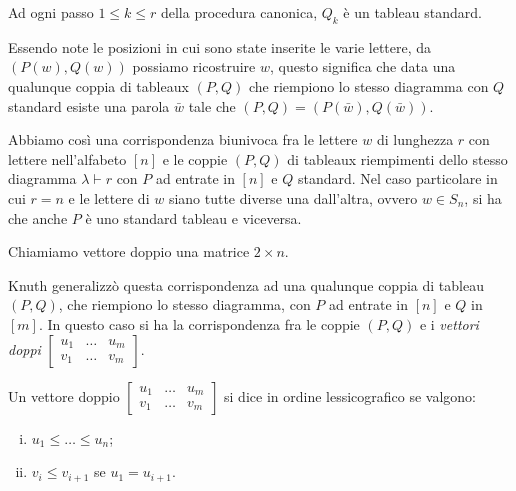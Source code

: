 \begin{oss}
Ad ogni passo $1 \leq k \leq r$ della procedura canonica, $Q_k$ \`e un
tableau standard.
\end{oss}

Essendo note le posizioni in cui sono state inserite le varie lettere,
da $(P(w),Q(w))$ possiamo ricostruire $w$, questo significa che data
una qualunque coppia di tableaux $(P,Q)$ che riempiono lo stesso
diagramma con $Q$ standard esiste una parola $\bar w$ tale che
$(P,Q)=(P(\bar w),Q(\bar w))$.

Abbiamo cos\`i una corrispondenza
biunivoca fra le lettere $w$ di lunghezza $r$ con lettere
nell'alfabeto $[n]$ e le coppie $(P,Q)$ di tableaux riempimenti dello
stesso diagramma $\lambda \vdash r$ con $P$ ad entrate in $[n]$ e $Q$
standard. Nel caso particolare in cui $r=n$ e le lettere di $w$ siano
tutte diverse una dall'altra, ovvero $w \in S_n$, si ha che anche $P$
\`e uno standard tableau e viceversa.

\begin{notaz}
Chiamiamo vettore doppio una matrice $2 \times n$. 
\end{notaz}

Knuth generalizz\`o questa corrispondenza ad una qualunque coppia di
tableau $(P,Q)$, che riempiono lo stesso diagramma, con $P$ ad entrate
in $[n]$ e $Q$ in $[m]$. In questo caso si ha la corrispondenza fra le
coppie $(P,Q)$ e i \emph{vettori doppi}
\begin{math}
\begin{bmatrix}
u_1 & \ldots & u_m\\
v_1 & \ldots & v_m
\end{bmatrix}
\end{math}.

\begin{defn}
Un vettore doppio
\begin{math}
\begin{bmatrix}
u_1 & \ldots & u_m\\
v_1 & \ldots & v_m
\end{bmatrix}
\end{math}
si dice in ordine lessicografico se valgono:
\begin{enumerate}[(i)]
\item $u_1 \leq \ldots \leq u_n$;
\item $v_i \leq v_{i+1}$ se $u_1 = u_{i+1}$.
\end{enumerate}
\end{defn}
